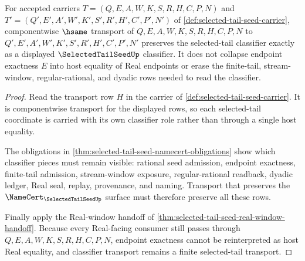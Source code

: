 \begin{theorem}
\label{thm:selected-tail-seed-classifier-transport}
For accepted carriers $T=(Q,E,A,W,K,S,R,H,C,P,N)$ and $T'=(Q',E',A',W',K',S',R',H',C',P',N')$ of \autoref{def:selected-tail-seed-carrier}, componentwise $\hsame$ transport of $Q,E,A,W,K,S,R,H,C,P,N$ to $Q',E',A',W',K',S',R',H',C',P',N'$ preserves the selected-tail classifier exactly as a displayed $\SelectedTailSeedUp$ classifier. It does not collapse endpoint exactness $E$ into host equality of Real endpoints or erase the finite-tail, stream-window, regular-rational, and dyadic rows needed to read the classifier.
\end{theorem}
\begin{proof}
Read the transport row $H$ in the carrier of \autoref{def:selected-tail-seed-carrier}. It is componentwise transport for the displayed rows, so each selected-tail coordinate is carried with its own classifier role rather than through a single host equality.

The obligations in \autoref{thm:selected-tail-seed-namecert-obligations} show which classifier pieces must remain visible: rational seed admission, endpoint exactness, finite-tail admission, stream-window exposure, regular-rational readback, dyadic ledger, Real seal, replay, provenance, and naming. Transport that preserves the $\NameCert_{\SelectedTailSeedUp}$ surface must therefore preserve all these rows.

Finally apply the Real-window handoff of \autoref{thm:selected-tail-seed-real-window-handoff}. Because every Real-facing consumer still passes through $Q,E,A,W,K,S,R,H,C,P,N$, endpoint exactness cannot be reinterpreted as host Real equality, and classifier transport remains a finite selected-tail transport.
\end{proof}

